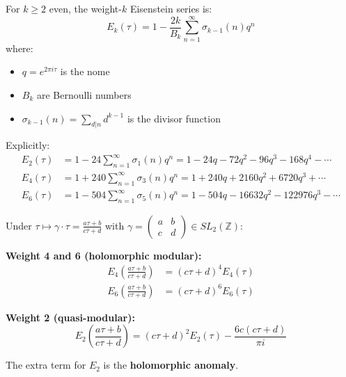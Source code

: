 \begin{definition}\label{def:eisenstein-series}
For $k \geq 2$ even, the weight-$k$ Eisenstein series is:
\begin{equation}
E_k(\tau) = 1 - \frac{2k}{B_k} \sum_{n=1}^{\infty} \sigma_{k-1}(n) q^n
\end{equation}
where:
\begin{itemize}
\item $q = e^{2\pi i \tau}$ is the nome
\item $B_k$ are Bernoulli numbers
\item $\sigma_{k-1}(n) = \sum_{d|n} d^{k-1}$ is the divisor function
\end{itemize}

Explicitly:
\begin{align}
E_2(\tau) &= 1 - 24\sum_{n=1}^{\infty} \sigma_1(n) q^n 
= 1 - 24q - 72q^2 - 96q^3 - 168q^4 - \cdots \label{eq:E2-expansion} \\
E_4(\tau) &= 1 + 240\sum_{n=1}^{\infty} \sigma_3(n) q^n 
= 1 + 240q + 2160q^2 + 6720q^3 + \cdots \label{eq:E4-expansion} \\
E_6(\tau) &= 1 - 504\sum_{n=1}^{\infty} \sigma_5(n) q^n 
= 1 - 504q - 16632q^2 - 122976q^3 - \cdots \label{eq:E6-expansion}
\end{align}
\end{definition}

\begin{proposition}\label{prop:eisenstein-modular}
Under $\tau \mapsto \gamma \cdot \tau = \frac{a\tau + b}{c\tau + d}$ with 
$\gamma = \begin{pmatrix} a & b \\ c & d \end{pmatrix} \in SL_2(\mathbb{Z})$:

\textbf{Weight 4 and 6 (holomorphic modular):}
\begin{align}
E_4\left(\frac{a\tau+b}{c\tau+d}\right) &= (c\tau + d)^4 E_4(\tau) \\
E_6\left(\frac{a\tau+b}{c\tau+d}\right) &= (c\tau + d)^6 E_6(\tau)
\end{align}

\textbf{Weight 2 (quasi-modular):}
\begin{equation}
E_2\left(\frac{a\tau+b}{c\tau+d}\right) = (c\tau + d)^2 E_2(\tau) 
- \frac{6c(c\tau + d)}{\pi i}
\end{equation}

The extra term for $E_2$ is the \textbf{holomorphic anomaly}.
\end{proposition}

